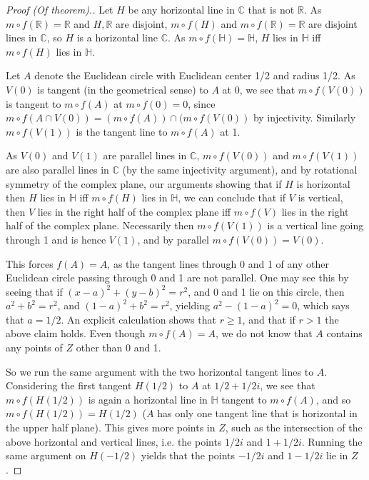 \documentclass[12pt]{article}
\theoremstyle{definitionstyle}
\def\mbb#1{\mathbb{#1}}
\def \C{\mbb{C}}
\def \R{\mbb{R}}
\renewcommand{\H}{\mbb H}
\begin{document}
\begin{proof}[Proof (Of theorem).]
		Let $H$ be any horizontal line in $\C$ that is not $\R$. As $m \circ f(\R) = \R$ and $H, \R$ are disjoint, $m \circ f(H)$ and $m \circ f(\R) = \R$ are disjoint lines in $\C$, so $H$ is a horizontal line $\C$. As $m \circ f(\H) = \H$, $H$ lies in $\H$ iff $m \circ f(H)$ lies in $\H$.
		
		Let $A$ denote the Euclidean circle with Euclidean center 1/2 and radius 1/2. As $V(0)$ is tangent (in the geometrical sense) to $A$ at 0, we see that $m \circ f(V(0))$ is tangent to $m \circ f(A)$ at $m \circ f(0) = 0$, since $m \circ f(A \cap V(0)) = (m \circ f(A)) \cap (m \circ f(V(0))$ by injectivity. Similarly $m \circ f(V(1))$ is the tangent line to $m \circ f(A)$ at 1.
		
		As $V(0)$ and $V(1)$ are parallel lines in $\C$, $m \circ f(V(0))$ and $m \circ f(V(1))$ are also parallel lines in $\C$ (by the same injectivity argument), and by rotational symmetry of the complex plane, our arguments showing that if $H$ is horizontal then $H$ lies in $\mbb H$ iff $m \circ f(H)$ lies in $\mbb H$, we can conclude that if $V$ is vertical, then $V$ lies in the right half of the complex plane iff $m \circ f(V)$ lies in the right half of the complex plane. Necessarily then $m \circ f(V(1))$ is a vertical line going through 1 and is hence $V(1)$, and by parallel $m \circ f(V(0)) = V(0)$.
		
		This forces $f(A) = A$, as the tangent lines through 0 and 1 of any other Euclidean circle passing through 0 and 1 are not parallel. One may see this by seeing that if $(x-a)^2+(y-b)^2 = r^2$, and 0 and 1 lie on this circle, then $a^2 + b^2 = r^2$, and $(1-a)^2 + b^2 = r^2$, yielding $a^2 - (1-a)^2 = 0$, which says that $a=1/2$. An explicit calculation shows that $r \geq 1$, and that if $r > 1$ the above claim holds. Even though $m \circ f(A) = A$, we do not know that $A$ contains any points of $Z$ other than 0 and 1.
		
		So we run the same argument with the two horizontal tangent lines to $A$. Considering the first tangent $H(1/2)$ to $A$ at $1/2 + 1/2 i$, we see that $m \circ f(H(1/2))$ is again a horizontal line in $\H$ tangent to $m \circ f(A)$, and so $m \circ f(H(1/2)) = H(1/2)$ ($A$ has only one tangent line that is horizontal in the upper half plane). This gives more points in $Z$, such as the intersection of the above horizontal and vertical lines, i.e. the points $1/2i$ and $1 + 1/2 i$. Running the same argument on $H(-1/2)$ yields that the points $-1/2i$ and $1 - 1/2i$ lie in $Z$. 
		

\end{proof}
\end{document}
